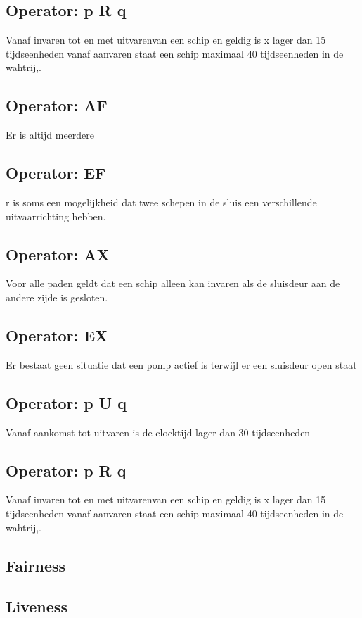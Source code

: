  \subsection{Operator: p R q}
 Vanaf invaren tot en met uitvarenvan een schip en geldig is x lager dan 15 tijdseenheden
 vanaf aanvaren staat een schip maximaal 40 tijdseenheden in de wahtrij,.
 
 \subsection{Operator: AF}
 Er is altijd meerdere
 \subsection{Operator: EF}
 r is soms een mogelijkheid dat twee schepen in de sluis een verschillende uitvaarrichting hebben.
 \subsection{Operator: AX}
 Voor alle paden geldt dat een schip alleen kan invaren als de sluisdeur aan de andere zijde is gesloten.
 \subsection{Operator: EX}
 Er bestaat geen situatie dat een pomp actief is terwijl er een sluisdeur open staat
 \subsection{Operator: p U q}
 Vanaf aankomst tot uitvaren is de clocktijd lager dan 30 tijdseenheden 
 \subsection{Operator: p R q}
 Vanaf invaren tot en met uitvarenvan een schip en geldig is x lager dan 15 tijdseenheden
 vanaf aanvaren staat een schip maximaal 40 tijdseenheden in de wahtrij,.
 
 \subsection{Fairness}
 
 \subsection{Liveness}
 
 
 
